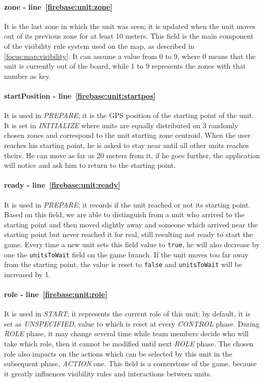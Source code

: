 				\paragraph{zone - line~\ref{firebase:unit:zone}}
				It is the last zone in which the unit was seen; it is updated when the unit moves out of its previous zone for at least 10 meters. This field is the main component of the visibility rule system used on the map, as described in \autoref{focus:map:visibility}. It can assume a value from 0 to 9, where 0 means that the unit is currently out of the board, while 1 to 9 represents the zones with that number as key.
				
				\paragraph{startPosition - line~\ref{firebase:unit:startpos}}
				It is used in \emph{PREPARE}; it is the GPS position of the starting point of the unit. It is set in \emph{INITIALIZE} where units are equally distributed on 3 randomly chosen zones and correspond to the unit starting zone centroid.
				When the user reaches his starting point, he is asked to stay near until all other units reaches theirs. He can move as far as 20 meters from it, if he goes further, the application will notice and ask him to return to the starting point.
				
				\paragraph{ready - line~\ref{firebase:unit:ready}}
				It is used in \emph{PREPARE}; it records if the unit reached or not its starting point. Based on this field, we are able to distinguish from a unit who arrived to the starting point and then moved slightly away and someone which arrived near the starting point but never reached it for real, still resulting not ready to start the game. Every time a new unit sets this field value to \lstinline|true|, he will also decrease by one the \lstinline|unitsToWait| field on the game branch.
				If the unit moves too far away from the starting point, the value is reset to \lstinline|false| and \lstinline|unitsToWait| will be increased by 1. 
				
				\paragraph{role - line~\ref{firebase:unit:role}}
				It is used in \emph{START}; it represents the current role of this unit; by default, it is set as \emph{UNSPECIFIED}, value to which is reset at every \emph{CONTROL} phase.
				During \emph{ROLE} phase, it may change several time while team members decide who will take which role, then it cannot be modified until next \emph{ROLE} phase.
				The chosen role also impacts on the actions which can be selected by this unit in the subsequent phase, \emph{ACTION} one.
				This field is a cornerstone of the game, because it greatly influences visibility rules and interactions between units.
				
